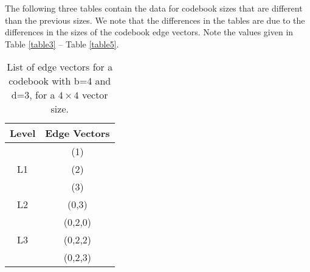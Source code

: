 The following three tables contain the data for codebook sizes that
are different than the previous sizes.  We note that the differences
in the tables are due to the differences in the sizes of the codebook
edge vectors.  Note the values given in Table \ref{table3} --
Table \ref{table5}.


\begin{table}[!t]
  \renewcommand{\arraystretch}{1.3}
  \centering

  \caption{List of edge vectors for a codebook with b=4 and d=3, for a
    $4 \times 4$ vector size.}
  \label{table2}

  \begin{tabular}{|c|c|} \hline
    Level & Edge Vectors \\ \hline

    & (1)\\
    L1 & (2)\\
    & (3) \\ \hline

    L2 & (0,3) \\ \hline

    & (0,2,0)\\
    L3 & (0,2,2)\\
    & (0,2,3) \\ \hline

  \end{tabular}

\end{table}

